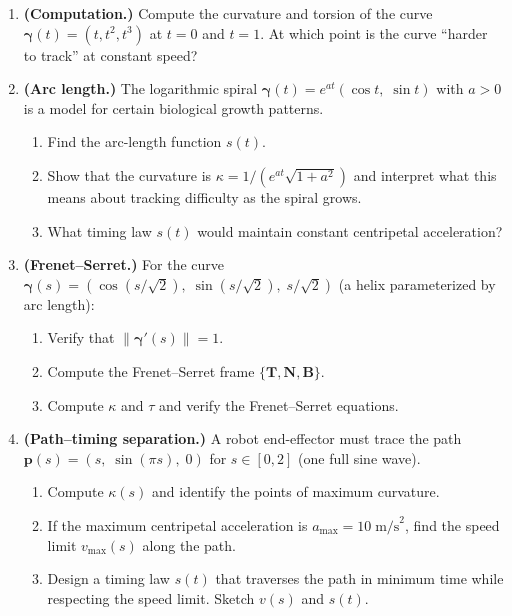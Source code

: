 \documentclass[12pt, openany]{book}
\theoremstyle{plain}
\newcommand{\traj}{\bm{\gamma}}
\newcommand{\norm}[1]{\left\lVert #1 \right\rVert}
\newcommand{\tangent}{\bm{T}}
\newcommand{\normal}{\bm{N}}
\newcommand{\binormal}{\bm{B}}
\begin{document}
\begin{enumerate}[label=\textbf{2.\arabic*.}, leftmargin=1.5cm]

\item \textbf{(Computation.)} Compute the curvature and torsion of the curve
  $\traj(t) = (t, t^2, t^3)$ at $t = 0$ and $t = 1$. At which point is the
  curve ``harder to track'' at constant speed?

\item \textbf{(Arc length.)} The logarithmic spiral $\traj(t) = e^{at}(\cos t,\;
  \sin t)$ with $a > 0$ is a model for certain biological growth patterns.
  \begin{enumerate}[label=(\alph*)]
    \item Find the arc-length function $s(t)$.
    \item Show that the curvature is $\kappa = 1/(e^{at}\sqrt{1 + a^2})$ and
      interpret what this means about tracking difficulty as the spiral grows.
    \item What timing law $s(t)$ would maintain constant centripetal acceleration?
  \end{enumerate}

\item \textbf{(Frenet--Serret.)} For the curve $\traj(s) = (\cos(s/\sqrt{2}),\;
  \sin(s/\sqrt{2}),\; s/\sqrt{2})$ (a helix parameterized by arc length):
  \begin{enumerate}[label=(\alph*)]
    \item Verify that $\norm{\traj'(s)} = 1$.
    \item Compute the Frenet--Serret frame $\{\tangent, \normal, \binormal\}$.
    \item Compute $\kappa$ and $\tau$ and verify the Frenet--Serret equations.
  \end{enumerate}

\item \textbf{(Path--timing separation.)} A robot end-effector must trace the
  path $\bm{p}(s) = (s,\; \sin(\pi s),\; 0)$ for $s \in [0, 2]$
  (one full sine wave).
  \begin{enumerate}[label=(\alph*)]
    \item Compute $\kappa(s)$ and identify the points of maximum curvature.
    \item If the maximum centripetal acceleration is $a_{\max} = 10\;\text{m/s}^2$,
      find the speed limit $v_{\max}(s)$ along the path.
    \item Design a timing law $s(t)$ that traverses the path in minimum time
      while respecting the speed limit. Sketch $v(s)$ and $s(t)$.
  \end{enumerate}


\end{enumerate}
\end{document}
